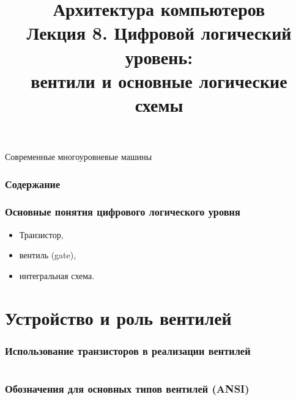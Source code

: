\newcommand{\h}{%
handout,%
}



\usepackage{animate}

\title[Цифровая логика: вентили и схемы]{Архитектура компьютеров\texorpdfstring{\\}{ }Лекция 8. Цифровой логический уровень:\texorpdfstring{\\}{ }вентили и основные логические схемы}



\begin{frame}
\titlepage
\end{frame}

\begin{frame}{Современные многоуровневые машины}
\end{frame}

\begin{frame}
\frametitle{Содержание}
\tableofcontents
\end{frame}

\begin{frame}
\frametitle{Основные понятия цифрового логического уровня}
\Large\begin{itemize}
    \item Транзистор,
    \item вентиль (gate),
    \item интегральная схема.
\end{itemize}
\end{frame}

\section {Устройство и роль вентилей}
\begin{frame}
\frametitle{Использование транзисторов в реализации вентилей}
\begin{columns}
    \column{3cm} \pause{}
    \column{2.5cm} \pause{}
    \column{4.5cm} \pause{}
\end{columns}
\end{frame}

\begin{frame}
\frametitle{Обозначения для основных типов вентилей (ANSI)}
\pause
{}
\end{frame}

